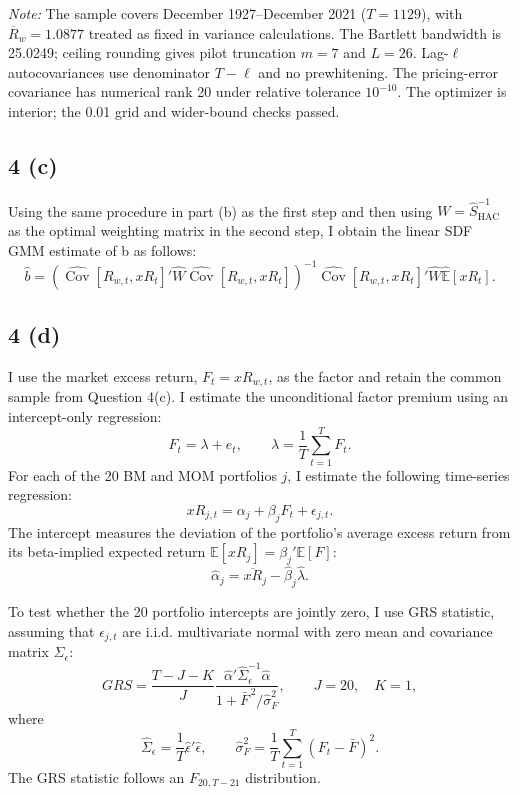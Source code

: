\documentclass[11pt]{article}
\begin{document}
\begin{table}[H]
\begin{minipage}{0.98\textwidth}
    \par\smallskip
    {\footnotesize\raggedright \textit{Note:} The sample covers December 1927--December 2021 ($T=1129$), with $\overline{R}_w=1.0877$ treated as fixed in variance calculations. The Bartlett bandwidth is 25.0249; ceiling rounding gives pilot truncation $m=7$ and $L=26$. Lag-$\ell$ autocovariances use denominator $T-\ell$ and no prewhitening. The pricing-error covariance has numerical rank 20 under relative tolerance $10^{-10}$. The optimizer is interior; the 0.01 grid and wider-bound checks passed.\par}
  \end{minipage}
\end{table}
\subsection*{4 (c)}
Using the same procedure in part (b) as the first step and then using $W = \hat{S}_{\mathrm{HAC}}^{-1}$ as the optimal weighting matrix in the second step, 
I obtain the linear SDF GMM estimate of b as follows: 
\[
    \hat{b} = (\hat{\operatorname{Cov}}[R_{w,t}, xR_t]' \hat{W} \hat{\operatorname{Cov}}[R_{w,t}, xR_t])^{-1} \hat{\operatorname{Cov}}[R_{w,t}, xR_t]' \hat{W} \hat{\mathbb{E}}[xR_t].
\]


\subsection*{4 (d)}
I use the market excess return, $F_t=xR_{w,t}$, as the factor and
retain the common sample from Question 4(c). I estimate the
unconditional factor premium using an intercept-only regression:
\[
F_t=\lambda+e_t,
\qquad
\hat{\lambda}=\frac{1}{T}\sum_{t=1}^{T}F_t.
\]
For each of the 20 BM and MOM portfolios $j$, I estimate the following time-series regression:
\[
xR_{j,t}=\alpha_j+\beta_jF_t+\epsilon_{j,t}.
\]
The intercept measures the deviation of the portfolio's average
excess return from its beta-implied expected return $\mathbb{E}[xR_j]=\beta_j' \mathbb{E}[F]$: 
\[
\hat{\alpha}_j
=\overline{xR}_j-\hat{\beta}_j\hat{\lambda}.
\]

To test whether the 20 portfolio intercepts are jointly zero, I use GRS statistic, assuming that
$\epsilon_{j,t}$ are i.i.d. multivariate normal with zero mean and covariance matrix $\Sigma_{\epsilon}$:
\[
GRS=
\frac{T-J-K}{J}
\frac{\hat{\alpha}'\hat{\Sigma}_{\epsilon}^{-1}\hat{\alpha}}
{1+\bar{F}^{\,2}/\hat{\sigma}_{F}^{2}},
\qquad J=20,\quad K=1,
\]
where
\[
\hat{\Sigma}_{\epsilon}
=\frac{1}{T}\hat{\epsilon}'\hat{\epsilon},
\qquad
\hat{\sigma}_{F}^{2}
=\frac{1}{T}\sum_{t=1}^{T}(F_t-\bar{F})^2.
\]
The GRS statistic follows an $F_{20,T-21}$ distribution. 
\end{document}
